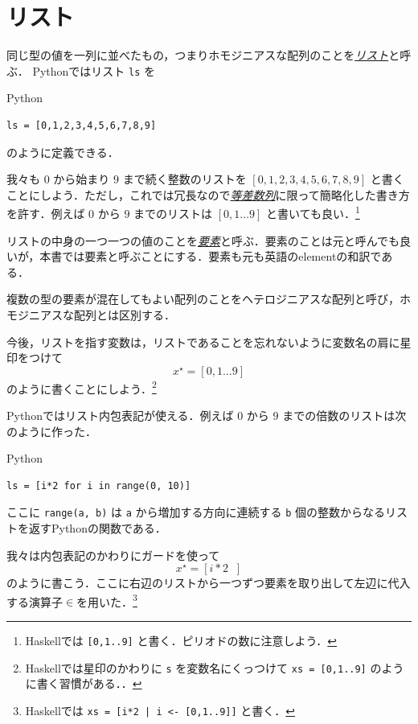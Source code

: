 \documentclass[a4paper]{jsbook}
\newcommand{\programminglanguage}[1]{\textsf{#1}}
\newcommand{\haskell}{\programminglanguage{Haskell}}
\newcommand{\python}{\programminglanguage{Python}}
\newcommand{\keyword}[1]{{\underline{\emph{#1}}}}
\newcommand{\code}[1]{\texttt{#1}}
\newenvironment{pythoncode}{\begin{itembox}[r]{\python}}{\end{itembox}}
\newcommand{\mListWith}[1]{\left[#1\right]}
\newcommand{\mList}[1]{{#1}^\mathrm{\star}}
\newcommand{\mGuard}[1]{\mathop{\mid_{#1}}}
\DeclareMathOperator{\mFrom}{\in}
\begin{document}
\section{リスト}

同じ型の値を一列に並べたもの，つまりホモジニアスな配列のことを\keyword{リスト}と呼ぶ．
\python ではリスト \code{ls} を
\begin{pythoncode}
\begin{verbatim}
ls = [0,1,2,3,4,5,6,7,8,9]
\end{verbatim}
\end{pythoncode}
のように定義できる．

我々も $0$ から始まり $9$ まで続く整数のリストを $[0,1,2,3,4,5,6,7,8,9]$ と書くことにしよう．ただし，これでは冗長なので\keyword{等差数列}に限って簡略化した書き方を許す．例えば $0$ から $9$ までのリストは $\mListWith{0,1\dots9}$ と書いても良い．\footnote{\haskell では \code{[0,1..9]} と書く．ピリオドの数に注意しよう．}

リストの中身の一つ一つの値のことを\keyword{要素}と呼ぶ．要素のことは元と呼んでも良いが，本書では要素と呼ぶことにする．要素も元も英語のelementの和訳である．

複数の型の要素が混在してもよい配列のことをヘテロジニアスな配列と呼び，ホモジニアスな配列とは区別する．

今後，リストを指す変数は，リストであることを忘れないように変数名の肩に星印をつけて
\begin{equation}
\mList{x}=\mListWith{0,1\dots9}
\end{equation}
のように書くことにしよう．\footnote{\haskell では星印のかわりに \code{s} を変数名にくっつけて \code{xs = [0,1..9]} のように書く習慣がある．．}

\python ではリスト内包表記が使える．例えば $0$ から $9$ までの倍数のリストは次のように作った．
\begin{pythoncode}
\begin{verbatim}
ls = [i*2 for i in range(0, 10)]
\end{verbatim}
\end{pythoncode}
ここに \code{range(a, b)} は \code{a} から増加する方向に連続する \code{b} 個の整数からなるリストを返す\python の関数である．

我々は内包表記のかわりにガードを使って
\begin{equation}
\mList{x}=\mListWith{i*2\mGuard{i\mFrom{\mListWith{0,1\dots9}}}}
\end{equation}
のように書こう．ここに右辺のリストから一つずつ要素を取り出して左辺に代入する演算子$\mFrom$を用いた．\footnote{\haskell では \code{xs = [i*2 | i <- [0,1..9]]} と書く．}
\end{document}
